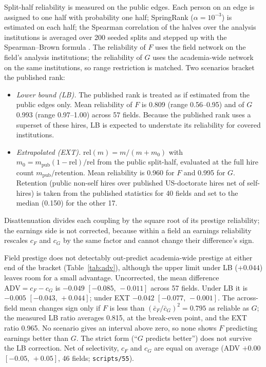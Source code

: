 \documentclass[11pt]{article}
\newcommand{\ci}[2]{$[#1,\allowbreak\,#2]$}
\newcommand{\scr}[1]{\texttt{scripts/#1}}
\begin{document}
Split-half reliability is measured on the public edges. Each person on an edge is assigned to one half with
probability one half; SpringRank ($\alpha=10^{-3}$) is estimated on each half; the Spearman correlation of the
halves over the analysis institutions is averaged over 200 seeded splits and stepped up with the
Spearman--Brown formula \citep{spearman1910correlation, brown1910some}. The reliability of $F$ uses the field network on the field's analysis institutions;
the reliability of $G$ uses the academia-wide network on the same institutions, so range restriction is
matched. Two scenarios bracket the published rank:
\begin{itemize}
\item \emph{Lower bound (LB).} The published rank is treated as if estimated from the public edges only. Mean
reliability of $F$ is 0.809 (range 0.56--0.95) and of $G$ 0.993 (range 0.97--1.00) across 57 fields. Because
the published rank uses a superset of these hires, LB is expected to understate its reliability for covered
institutions.
\item \emph{Extrapolated (EXT).} $\text{rel}(m)=m/(m+m_0)$ with $m_0=m_{\text{pub}}(1-\text{rel})/\text{rel}$
from the public split-half, evaluated at the full hire count $m_{\text{pub}}/\text{retention}$. Mean
reliability is 0.960 for $F$ and 0.995 for $G$. Retention (public non-self hires over published US-doctorate
hires net of self-hires) is taken from the published statistics for 40 fields and set to the median (0.150)
for the other 17.
\end{itemize}
Disattenuation divides each coupling by the square root of its prestige reliability; the earnings side is not
corrected, because within a field an earnings reliability rescales $c_F$ and $c_G$ by the same factor and cannot
change their difference's sign.

Field prestige does not detectably out-predict academia-wide prestige at either end of the bracket
(Table~\ref{tab:adv}), although the upper limit under LB ($+0.044$) leaves room for a small advantage. Uncorrected, the mean difference $\text{ADV}=c_F-c_G$ is $-0.049$ \ci{-0.085}{-0.011}
across 57 fields. Under LB it is $-0.005$ \ci{-0.043}{+0.044}; under EXT $-0.042$ \ci{-0.077}{-0.001}. The
across-field mean changes sign only if $F$ is less than $(\bar c_F/\bar c_G)^2=0.795$ as reliable as $G$; the
measured LB ratio averages 0.815, at the break-even point, and the EXT ratio 0.965. No scenario gives an
interval above zero, so none shows $F$ predicting earnings better than $G$. The strict form (``$G$ predicts
better'') does not survive the LB correction. Net of selectivity, $c_F$ and $c_G$ are equal on average
(ADV $+0.00$ \ci{-0.05}{+0.05}, 46 fields; \scr{55}).
\end{document}
